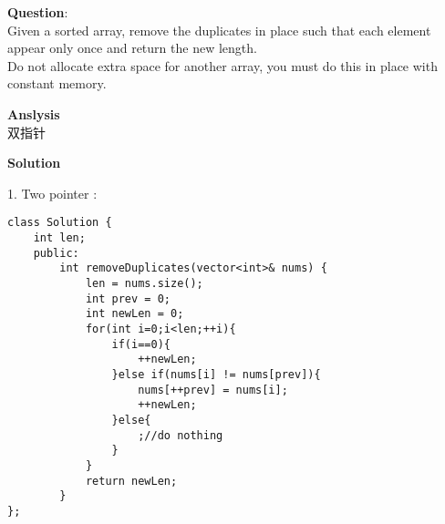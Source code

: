 \begin{description}
    \item{\textbf{Question}}:\\%
		Given a sorted array, remove the duplicates in place such that each element appear only once and return the new length.\\
		Do not allocate extra space for another array, you must do this in place with constant memory.\\

    \item{\textbf{Anslysis}}\\
		双指针\\

    \item{\textbf{Solution}}\\
	\item{1. Two pointer} : \\
		\begin{lstlisting}
class Solution {
	int len;
	public:
		int removeDuplicates(vector<int>& nums) {
			len = nums.size();
			int prev = 0;
			int newLen = 0;
			for(int i=0;i<len;++i){
				if(i==0){
					++newLen;
				}else if(nums[i] != nums[prev]){
					nums[++prev] = nums[i];
					++newLen;
				}else{
					;//do nothing
				}
			}
			return newLen;
		}
};
		\end{lstlisting}
\end{description}


